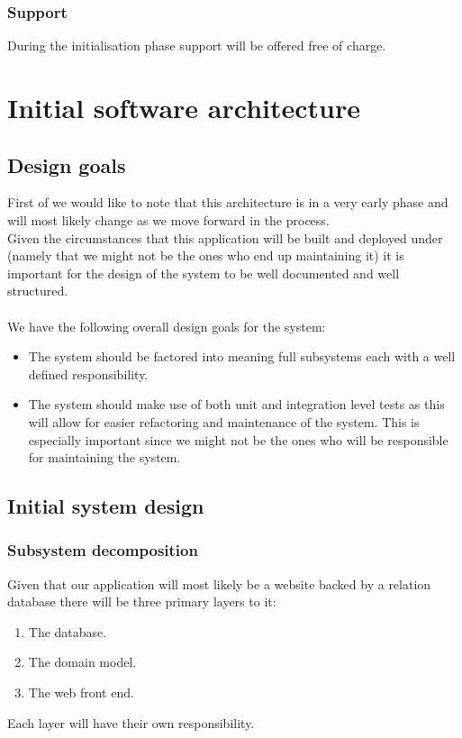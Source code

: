 \documentclass[12pt]{article}
\begin{document}
\subsubsection{Support}
During the initialisation phase support will be offered free of charge.
\section{Initial software architecture}
\subsection{Design goals}
First of we would like to note that this architecture is in a very early phase
and will most likely change as we move forward in the process.\\
Given the circumstances that this application will be built and deployed under (namely that we might not be the ones who end up maintaining it) it is important for the design of the system to be well documented and well structured.\\\\
We have the following overall design goals for the system:
\begin{itemize}
  \item The system should be factored into meaning full subsystems each with a well defined responsibility.
  \item The system should make use of both unit and integration level tests as this will allow for easier refactoring and maintenance of the system. This is especially important since we might not be the ones who will be responsible for maintaining the system.
\end{itemize}
\subsection{Initial system design}
\subsubsection{Subsystem decomposition}
Given that our application will most likely be a website backed by a relation database there will be three primary layers to it:

\begin{enumerate}
  \item The database.
  \item The domain model.
  \item The web front end.
\end{enumerate}
Each layer will have their own responsibility.
\end{document}
